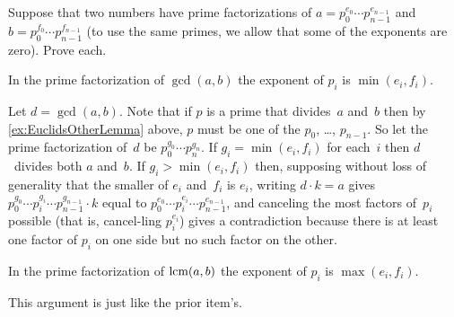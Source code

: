 \documentclass{ibl}  %
\begin{document}
\begin{problem}[\maxlength]
Suppose that two numbers have prime factorizations 
of $a=p_0^{e_0}\cdots p_{n-1}^{e_{n-1}}$
and $b=p_0^{f_0}\cdots p_{n-1}^{f_{n-1}}$
(to use the same primes, we allow that some of the exponents are zero).
Prove each.
\begin{exes}
\begin{exercise}
  In the prime factorization of
  $\gcd(a,b)$ the exponent of $p_i$ is $\min(e_i,f_i)$.
\end{exercise}
\begin{answer}
  Let $d=\gcd(a,b)$.
  Note that if $p$ is a prime that divides~$a$ and~$b$ then
  by \ref{ex:EuclidsOtherLemma} above, $p$ must be one of the 
  $p_0$, \ldots, $p_{n-1}$.   
  So let the prime factorization of~$d$ be $p_0^{g_0}\cdots p_n^{g_n}$. 
  If $g_i=\min(e_i,f_i)$ for each~$i$ then $d$~divides both $a$ and~$b$.
  If $g_i>\min(e_i,f_i)$ then, supposing without loss of generality
  that the smaller of $e_i$ and~$f_i$ is $e_i$, writing
  $d\cdot k=a$ gives $p_0^{g_0}\cdots p_i^{g_i}\cdots p_{n-1}^{g_{n-1}}\cdot k$
  equal to $p_0^{e_0}\cdots p_i^{e_i}\cdots p_{n-1}^{e_{n-1}}$, and 
  canceling the most factors of~$p_i$ possible (that is, cancel-ling $p_i^{e_i}$)
  gives a contradiction because there is at least one factor
  of $p_i$ on one side but no such factor on the other.  
\end{answer}
\begin{exercise} 
  In the prime factorization of $\operatorname{lcm}(a,b)$ the exponent of 
  $p_i$ is $\max(e_i,f_i)$.
\end{exercise}
\begin{answer}
  This argument is just like the prior item's.    
\end{answer}
\end{exes}

\end{problem}
\end{document}
